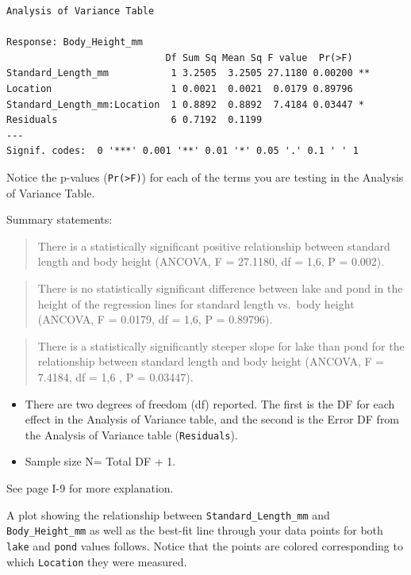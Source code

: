 \documentclass[twoside, 12pt]{article}
\begin{document}
\begin{Verbatim}[frame=single]
Analysis of Variance Table

Response: Body_Height_mm
                            Df Sum Sq Mean Sq F value  Pr(>F)   
Standard_Length_mm           1 3.2505  3.2505 27.1180 0.00200 **
Location                     1 0.0021  0.0021  0.0179 0.89796   
Standard_Length_mm:Location  1 0.8892  0.8892  7.4184 0.03447 * 
Residuals                    6 0.7192  0.1199                   
---
Signif. codes:  0 '***' 0.001 '**' 0.01 '*' 0.05 '.' 0.1 ' ' 1
\end{Verbatim}

Notice the p-values (\texttt{Pr(\textgreater{}F)}) for each of the terms
you are testing in the Analysis of Variance Table.

Summary statements:

\begin{quote}
There is a statistically significant positive relationship between
standard length and body height (ANCOVA, F = 27.1180, df = 1,6, P =
0.002).
\end{quote}

\begin{quote}
There is no statistically significant difference between lake and pond
in the height of the regression lines for standard length vs.~body
height (ANCOVA, F = 0.0179, df = 1,6, P = 0.89796).
\end{quote}

\begin{quote}
There is a statistically significantly steeper slope for lake than pond
for the relationship between standard length and body height (ANCOVA, F
= 7.4184, df = 1,6 , P = 0.03447).
\end{quote}

\begin{itemize}
\item
  There are two degrees of freedom (df) reported. The first is the DF
  for each effect in the Analysis of Variance table, and the second is
  the Error DF from the Analysis of Variance table (\texttt{Residuals}).
\item
  Sample size N= Total DF + 1.
\end{itemize}

See page I-9 for more explanation.

A plot showing the relationship between \texttt{Standard\_Length\_mm}
and \texttt{Body\_Height\_mm} as well as the best-fit line through your
data points for both \texttt{lake} and \texttt{pond} values follows.
Notice that the points are colored corresponding to which
\texttt{Location} they were measured.
\end{document}
